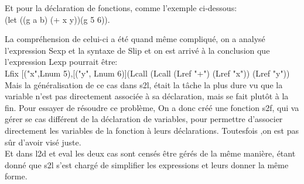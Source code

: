 \documentclass{article}
\begin{document}
\begin{enumerate}
    Et pour la déclaration de fonctions, comme l'exemple ci-dessous:\\
    (let ((g a b) (+ x y))(g 5 6)).
    
    La compréhension de celui-ci a été quand même compliqué, on a analysé l'expression Sexp et la syntaxe de Slip et on est arrivé à la conclusion que l'expression Lexp pourrait être:\\
    Lfix [("x",Lnum 5),[("y", Lnum 6)](Lcall (Lcall (Lref "+") (Lref "x")) (Lref "y"))
    \\
    
    Mais la généralisation de ce cas dans s2l, était la tâche la plus dure vu que la variable n'est pas directement associée à sa déclaration, mais se fait plutôt à la fin.
    Pour essayer de résoudre ce problème, On a donc créé une fonction s2f, qui va gérer se cas différent de la déclaration de variables, pour permettre d'associer directement les variables de la fonction  à leurs déclarations. Toutesfois ,on est pas sûr d'avoir visé juste. \\
    
    Et dans l2d et eval les deux cas sont censés être  gérés de la même manière, étant donné que s2l s'est chargé de simplifier les expressions et leurs donner la même forme.
    
    
    
\end{enumerate}
\end{document}
